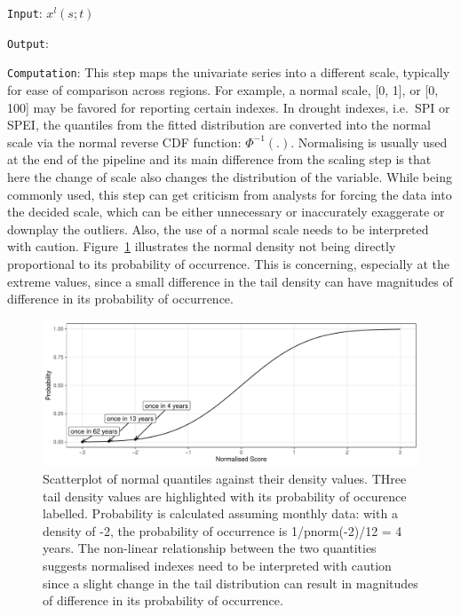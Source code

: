 \documentclass[
]{interact}
\begin{document}
\texttt{Input}: \(x^l(s; t)\)

\texttt{Output}:

\texttt{Computation}: This step maps the univariate series into a
different scale, typically for ease of comparison across regions. For
example, a normal scale, {[}0, 1{]}, or {[}0, 100{]} may be favored for
reporting certain indexes. In drought indexes, i.e.~SPI or SPEI, the
quantiles from the fitted distribution are converted into the normal
scale via the normal reverse CDF function: \(\Phi^{-1}(.)\). Normalising
is usually used at the end of the pipeline and its main difference from
the scaling step is that here the change of scale also changes the
distribution of the variable. While being commonly used, this step can
get criticism from analysts for forcing the data into the decided scale,
which can be either unnecessary or inaccurately exaggerate or downplay
the outliers. Also, the use of a normal scale needs to be interpreted
with caution. Figure~\ref{fig-normalising} illustrates the normal
density not being directly proportional to its probability of
occurrence. This is concerning, especially at the extreme values, since
a small difference in the tail density can have magnitudes of difference
in its probability of occurrence.

\begin{figure}

{\centering \includegraphics{tidyindex_files/figure-pdf/fig-normalising-1.pdf}

}

\caption{\label{fig-normalising}Scatterplot of normal quantiles against
their density values. THree tail density values are highlighted with its
probability of occurence labelled. Probability is calculated assuming
monthly data: with a density of -2, the probability of occurrence is
1/pnorm(-2)/12 = 4 years. The non-linear relationship between the two
quantities suggests normalised indexes need to be interpreted with
caution since a slight change in the tail distribution can result in
magnitudes of difference in its probability of occurrence.}

\end{figure}
\end{document}
